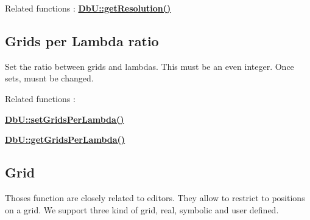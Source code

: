 Related functions \+: {\bfseries \hyperlink{group__DbUGroup_ga120a60b09b344d01c583567a1e489d9e}{Db\+U\+::get\+Resolution()}}\hypertarget{group__DbUGroup_secDbUGridsPerLamba}{}\subsection{Grids per Lambda ratio}\label{group__DbUGroup_secDbUGridsPerLamba}
Set the ratio between grids and lambdas. This must be an even integer. Once sets, musn\textquotesingle{}t be changed.

Related functions \+: 
\begin{DoxyItemize}
\item {\bfseries \hyperlink{group__DbUGroup_gac93f9ba2a09105227e34bd05bcb1500c}{Db\+U\+::set\+Grids\+Per\+Lambda()}} 
\item {\bfseries \hyperlink{group__DbUGroup_ga9a0359adbfafc356326f5c6adf57ff04}{Db\+U\+::get\+Grids\+Per\+Lambda()}} 
\end{DoxyItemize}\hypertarget{group__DbUGroup_secDbUGrid}{}\subsection{Grid}\label{group__DbUGroup_secDbUGrid}
Thoses function are closely related to editors. They allow to restrict to positions on a grid. We support three kind of grid, real, symbolic and user defined.


